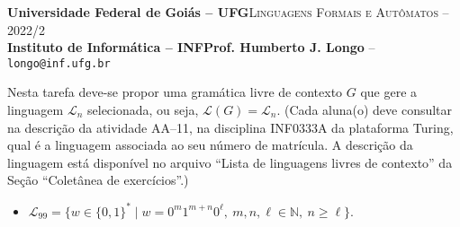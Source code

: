\documentclass[12pt]{article}
\def\discente{Fulana(o) de tal}
\def\matricula{20010101}
\def\ua{11}
\def\myling{{99}} %
\begin{document}
 \begin{tcolorbox}[rounded corners, colback=blue!3, colframe=blue!40!black]
  \footnotesize\textbf{Universidade Federal de Goiás -- UFG}\hfill \textsc{Linguagens Formais e Autômatos -- 2022/2}\\
  \footnotesize\textbf{Instituto de Informática -- INF\hfill Prof. Humberto J. Longo} -- \scriptsize\texttt{longo@inf.ufg.br}
 \end{tcolorbox}\bigskip
%
\begin{tcolorbox}[rounded corners, colback=blue!2, colframe=blue!40!black, title=\textbf{Atividade AA-\ua}]
  Nesta tarefa deve-se propor uma gramática livre de contexto $G$ que gere a linguagem $\mathcal{L}_n$ selecionada, ou seja, $\mathcal{L}(G)=\mathcal{L}_n$. (Cada aluna(o) deve consultar na descrição da atividade AA--\ua, na disciplina INF0333A da plataforma Turing, qual é a linguagem associada ao seu número de matrícula. A descrição da linguagem está disponível no arquivo ``Lista de linguagens livres de contexto'' da Seção ``Coletânea de exercícios''.)
\end{tcolorbox}\bigskip

%
\begin{tcolorbox}[rounded corners, colback=yellow!5, colframe=red!40!black, title={\discente\ (\matricula)}]
 \begin{itemize}[leftmargin=*]
  \item $\mathcal{L}_{\myling} = \{w\in\{0,1\}^*\mid w = 0^m1^{m+n}0^\ell,\ m,n,\ell\in\mathbb{N},\ n \geqslant \ell\}$.
 \end{itemize}
\end{tcolorbox}\bigskip
\end{document}
